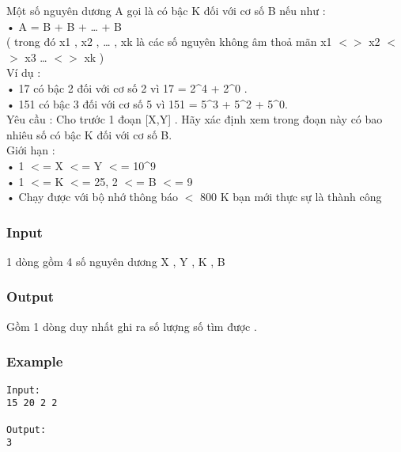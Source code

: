 



   Một số nguyên dương A gọi là có bậc K đối với cơ số B nếu như :   
\\   • A = B + B + … + B\textasciicircumxk   
\\   ( trong đó x1 , x2 , … , xk là các số nguyên không âm thoả mãn x1 $<$$>$ x2 $<$$>$ x3 … $<$$>$ xk )   
\\   Ví dụ :   
\\   • 17 có bậc 2 đối với cơ số 2 vì 17 = 2\textasciicircum4 + 2\textasciicircum0 .   
\\   • 151 có bậc 3 đối với cơ số 5 vì 151 = 5\textasciicircum3 + 5\textasciicircum2 + 5\textasciicircum0.   
\\   Yêu cầu : Cho trước 1 đoạn [X,Y] . Hãy xác định xem trong đoạn này có bao nhiêu số có bậc K đối với cơ số B.   
\\   Giới hạn :   
\\   • 1 $<$= X $<$= Y $<$= 10\textasciicircum9   
\\   • 1 $<$= K $<$= 25, 2 $<$= B $<$= 9   
\\   • Chạy được với bộ nhớ thông báo $<$ 800 K bạn mới thực sự là thành công   
\\

\subsubsection{   Input  }

   1 dòng gồm 4 số nguyên dương X , Y , K , B  

\subsubsection{   Output  }

   Gồm 1 dòng duy nhất ghi ra số lượng số tìm được .  

\subsubsection{   Example  }
\begin{verbatim}
Input:
15 20 2 2

Output:
3 
\end{verbatim}